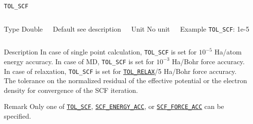 \documentclass[xcolor=dvipsnames,t]{beamer}
\begin{document}
\begin{frame}[allowframebreaks]{\texttt{TOL\_SCF}} \label{TOL_SCF}
\vspace*{-12pt}
\begin{columns}
\begin{block}{Type}
Double
\end{block}

\begin{block}{Default}
see description
\end{block}

\begin{block}{Unit}
No unit
\end{block}

\begin{block}{Example}
\texttt{TOL\_SCF}: 1e-5
\end{block}
\end{columns}

\begin{block}{Description}
In case of single point calculation, \texttt{TOL\_SCF} is set for $10^{-5}$ Ha/atom energy accuracy.
In case of MD, \texttt{TOL\_SCF} is set for $10^{-3}$ Ha/Bohr force accuracy.
In case of relaxation, \texttt{TOL\_SCF} is set for \hyperlink{TOL_RELAX}{\texttt{TOL\_RELAX}}/5 Ha/Bohr force accuracy. \\
The tolerance on the normalized residual of the effective potential or the electron density for convergence of the SCF iteration. 
\end{block}

\begin{block}{Remark}
Only one of \hyperlink{TOL_SCF}{\texttt{TOL\_SCF}}, \hyperlink{SCF_ENERGY_ACC}{\texttt{SCF\_ENERGY\_ACC}}, or \hyperlink{SCF_FORCE_ACC}{\texttt{SCF\_FORCE\_ACC}} can be specified.
\end{block}

\end{frame}
\end{document}
